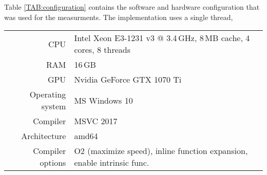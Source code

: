 \documentclass[report,11pt]{elsarticle}
\begin{document}
%
%
%
%
%
%

Table \ref{TAB:configuration} contains the software and hardware configuration that was used for the measurments. The implementation uses a single thread, 

\begin{table*}[t]
\begin{center}
\begin{tabular}{| r || l |}
\hline
	CPU & Intel Xeon E3-1231 v3 @ 3.4\,GHz, 8\,MB cache, 4 cores, 8 threads \\
	RAM & 16\,GB \\
	GPU & Nvidia GeForce GTX 1070 Ti \\
\hline
\hline
	Operating system & MS Windows 10 \\
	Compiler & MSVC 2017\\
	Architecture & amd64 \\
	Compiler options & O2 (maximize speed), inline function expansion, enable intrinsic func. \\
\hline
\end{tabular}
\end{center}
	\caption{Hardware and software configuration used for measurements.}
	\label{TAB:configuration}
\end{table*}
\end{document}
